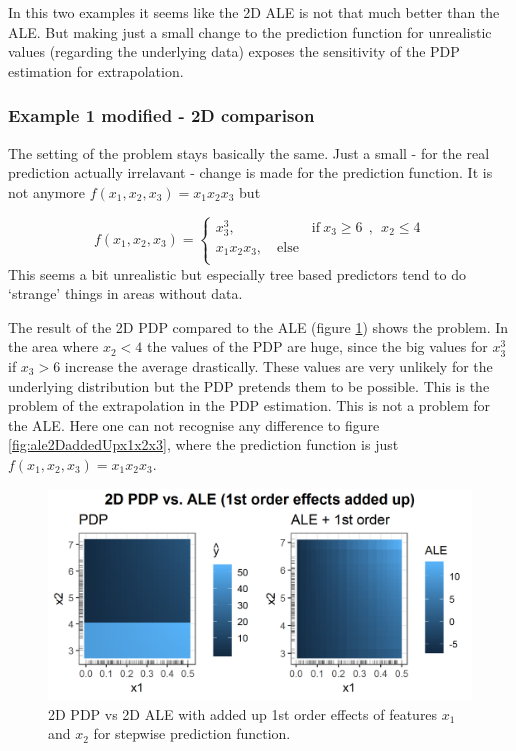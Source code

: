 \documentclass[
]{krantz}
\begin{document}
In this two examples it seems like the 2D ALE is not that much better than the ALE. But making just a small change to the prediction function for unrealistic values (regarding the underlying data) exposes the sensitivity of the PDP estimation for extrapolation.

\hypertarget{example-1-modified---2d-comparison}{%
\subsubsection{Example 1 modified - 2D comparison}\label{example-1-modified---2d-comparison}}

The setting of the problem stays basically the same. Just a small - for the real prediction actually irrelavant - change is made for the prediction function. It is not anymore \(f(x_1, x_2, x_3) = x_1 x_2 x_3\) but

\[
f(x_1, x_2, x_3) =  
     \begin{cases}
       x_3^3, \quad\quad\quad\quad\quad~~\text{if}~x_3\ge6 ~~, ~~x_2\le4\\
       x_1 x_2 x_3, \quad\text{else}\\
     \end{cases}
\]
This seems a bit unrealistic but especially tree based predictors tend to do `strange' things in areas without data.

The result of the 2D PDP compared to the ALE (figure \ref{fig:pdp2Ddamaged}) shows the problem. In the area where \(x_2 < 4\) the values of the PDP are huge, since the big values for \(x_3^3\) if \(x_3 > 6\) increase the average drastically. These values are very unlikely for the underlying distribution but the PDP pretends them to be possible. This is the problem of the extrapolation in the PDP estimation. This is not a problem for the ALE. Here one can not recognise any difference to figure \ref{fig:ale2DaddedUpx1x2x3}, where the prediction function is just \(f(x_1, x_2, x_3) = x_1 x_2 x_3\).

\begin{figure}
\includegraphics[width=1\linewidth]{images/ale_1_comp_2d_1st_orders_added_and_smaller3_bigger6_x1x2x3_150_0_0p5_5_1} \caption{2D PDP vs 2D ALE with added up 1st order effects of features \(x_1\) and \(x_2\) for stepwise prediction function.}\label{fig:pdp2Ddamaged}
\end{figure}
\end{document}
